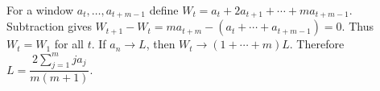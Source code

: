 For a window $a_t,\ldots,a_{t+m-1}$ define $W_t=a_t+2a_{t+1}+\cdots+ma_{t+m-1}$. Subtraction gives $W_{t+1}-W_t=ma_{t+m}-(a_t+\cdots+a_{t+m-1})=0$. Thus $W_t=W_1$ for all $t$. If $a_n\to L$, then $W_t\to(1+\cdots+m)L$. Therefore $\boxed{L=\dfrac{2\sum_{j=1}^m ja_j}{m(m+1)}}$.
